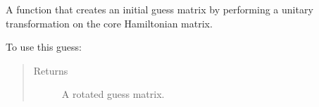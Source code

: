 \documentclass[letterpaper,10pt,english]{sphinxmanual}
\begin{document}
\begin{fulllineitems}
\begin{fulllineitems}
\begin{quote}
\begin{description}
\end{description}\end{quote}

\end{fulllineitems}


\begin{fulllineitems}
\label{\detokenize{GHF:ghf.GHF.GHF.unitary_rotation_guess}}
A function that creates an initial guess matrix by performing a unitary transformation on the core Hamiltonian
matrix.

To use this guess:

\begin{sphinxVerbatim}[commandchars=\\\{\}]
          
   
  
\end{sphinxVerbatim}
\begin{quote}\begin{description}
\item[{Returns}] \leavevmode
A rotated guess matrix.

\end{description}\end{quote}

\end{fulllineitems}


\end{fulllineitems}

\label{\detokenize{SCF_functions:module-ghf.SCF_functions}}
\end{document}
